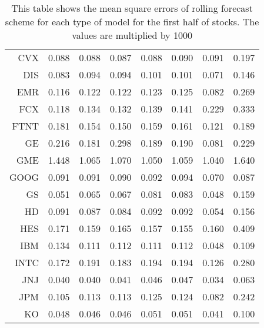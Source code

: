 \begin{table}[ht]
\begin{tabular}{rrrrrrrr}
  CVX & 0.088 & 0.088 & 0.087 & 0.088 & 0.090 & 0.091 & 0.197 \\ 
  DIS & 0.083 & 0.094 & 0.094 & 0.101 & 0.101 & 0.071 & 0.146 \\ 
  EMR & 0.116 & 0.122 & 0.122 & 0.123 & 0.125 & 0.082 & 0.269 \\ 
  FCX & 0.118 & 0.134 & 0.132 & 0.139 & 0.141 & 0.229 & 0.333 \\ 
  FTNT & 0.181 & 0.154 & 0.150 & 0.159 & 0.161 & 0.121 & 0.189 \\ 
  GE & 0.216 & 0.181 & 0.298 & 0.189 & 0.190 & 0.081 & 0.229 \\ 
  GME & 1.448 & 1.065 & 1.070 & 1.050 & 1.059 & 1.040 & 1.640 \\ 
  GOOG & 0.091 & 0.091 & 0.090 & 0.092 & 0.094 & 0.070 & 0.087 \\ 
  GS & 0.051 & 0.065 & 0.067 & 0.081 & 0.083 & 0.048 & 0.159 \\ 
  HD & 0.091 & 0.087 & 0.084 & 0.092 & 0.092 & 0.054 & 0.156 \\ 
  HES & 0.171 & 0.159 & 0.165 & 0.157 & 0.155 & 0.160 & 0.409 \\ 
  IBM & 0.134 & 0.111 & 0.112 & 0.111 & 0.112 & 0.048 & 0.109 \\ 
  INTC & 0.172 & 0.191 & 0.183 & 0.194 & 0.194 & 0.126 & 0.280 \\ 
  JNJ & 0.040 & 0.040 & 0.041 & 0.046 & 0.047 & 0.034 & 0.063 \\ 
  JPM & 0.105 & 0.113 & 0.113 & 0.125 & 0.124 & 0.082 & 0.242 \\ 
  KO & 0.048 & 0.046 & 0.046 & 0.051 & 0.051 & 0.041 & 0.100 \\ 
   \hline
\end{tabular}
\caption[MSE rolling forecast (1)]{This table shows the mean square errors of rolling forecast scheme for each type of model for the first half of stocks. 
                     The values are multiplied by 1000} 
\label{Table:MSE_r_1}
\end{table}
